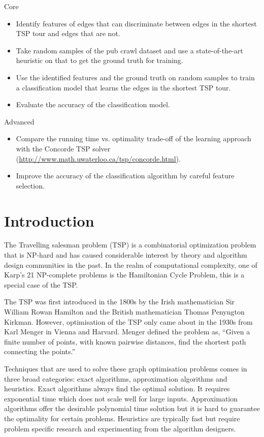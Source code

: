\documentclass[]{UCD_CS_FYP_Report}
\begin{document}
\LARGE Core
\normalsize
\begin{itemize}
    \item Identify features of edges that can discriminate between edges in the shortest TSP tour and edges that are not.
    \item Take random samples of the pub crawl dataset and use a state-of-the-art heuristic on that to get the ground truth for training.
    \item Use the identified features and the ground truth on random samples to train a classification model that learns the edges in the shortest TSP tour.
    \item Evaluate the accuracy of the classification model.
\end{itemize}
\LARGE Advanced
\normalsize
\begin{itemize}
    \item Compare the running time vs. optimality trade-off of the learning approach with the Concorde TSP solver (\url{http://www.math.uwaterloo.ca/tsp/concorde.html}).
    \item Improve the accuracy of the classification algorithm by careful feature selection.
\end{itemize}


\chapter{Introduction}
The Travelling salesman problem (TSP) is a combinatorial optimization problem that is NP-hard and has caused considerable interest by theory and algorithm design communities in the past. In the realm of computational complexity, one of Karp's 21 NP-complete problems is the Hamiltonian Cycle Problem, this is a special case of the TSP.

The TSP was first introduced in the 1800s by the Irish mathematician Sir William Rowan Hamilton and the British mathematician Thomas Penyngton Kirkman. However, optimisation of the TSP only came about in the 1930s from Karl Menger in Vienna and Harvard. Menger defined the problem as, “Given a finite number of points, with known pairwise distances, find the shortest path connecting the points.” \cite{Menger}

Techniques that are used to solve these graph optimisation problems comes in three broad categories: exact algorithms, approximation algorithms and heuristics. Exact algorithms always find the optimal solution. It requires exponential time which does not scale well for large inputs. Approximation algorithms offer the desirable polynomial time solution but it is hard to guarantee the optimality for certain problems. Heuristics are typically fast but require problem specific research and experimenting from the algorithm designers.
\end{document}
